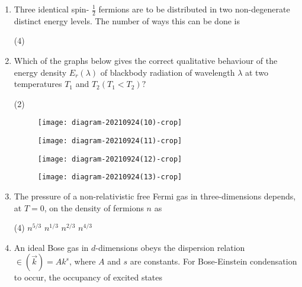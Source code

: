 \begin{enumerate}
	\begin{tasks}(4)
		\task[\textbf{A.}] $6 \varepsilon_{0}$
		\task[\textbf{B.}] $2 \varepsilon_{0}$
		\task[\textbf{C.}] $4 \varepsilon_{0}$.
		\task[\textbf{D.}] $\varepsilon_{0}$
	\end{tasks}
	\item Three identical spin- $\frac{1}{2}$ fermions are to be distributed in two non-degenerate distinct energy levels. The number of ways this can be done is
	{}
	\begin{tasks}(4)
	\end{tasks}
	\item Which of the graphs below gives the correct qualitative behaviour of the energy density $E_{r}(\lambda)$ of blackbody radiation of wavelength $\lambda$ at two temperatures $T_{1}$ and $T_{2}\left(T_{1}<T_{2}\right) ?$
	{}
	\begin{tasks}(2)
		\task[\textbf{A.}] \begin{figure}[H]
			\centering
			\texttt{[image: diagram-20210924(10)-crop]}
		\end{figure}
		\task[\textbf{B.}] \begin{figure}[H]
			\centering
			\texttt{[image: diagram-20210924(11)-crop]}
		\end{figure}
		\task[\textbf{C.}] \begin{figure}[H]
			\centering
			\texttt{[image: diagram-20210924(12)-crop]}
		\end{figure}
		\task[\textbf{D.}] \begin{figure}[H]
			\centering
			\texttt{[image: diagram-20210924(13)-crop]}
		\end{figure}
	\end{tasks}
	\item The pressure of a non-relativistic free Fermi gas in three-dimensions depends, at $T=0$, on the density of fermions $n$ as
	{}
	\begin{tasks}(4)
		\task[\textbf{A.}] $n^{5 / 3}$
		\task[\textbf{B.}] $n^{1 / 3}$
		\task[\textbf{C.}]  $n^{2 / 3}$
		\task[\textbf{D.}] $n^{4 / 3}$
	\end{tasks}
	\item An ideal Bose gas in $d$-dimensions obeys the dispersion relation $\in(\vec{k})=A k^{s}$, where $A$ and $s$ are constants. For Bose-Einstein condensation to occur, the occupancy of excited states

\end{enumerate}
